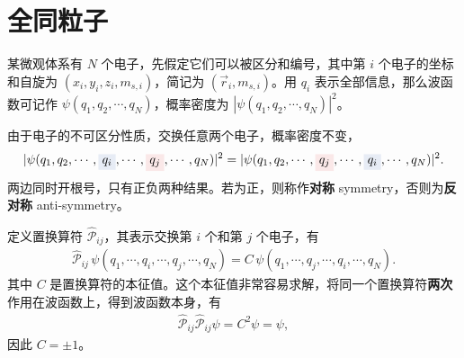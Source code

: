 \section{全同粒子}
某微观体系有 $N$ 个电子，先假定它们可以被区分和编号，其中第 $i$ 个电子的坐标和自旋为 $(x_i, y_i, z_i, m_{s,i})$，简记为 $(\vec r_i, m_{s,i})$。用 $q_i$ 表示全部信息，那么波函数可记作 $\psi(q_1, q_2, \cdots, q_N)$，概率密度为 $|\psi(q_1, q_2, \cdots, q_N)|^2$。

由于电子的不可区分性质，交换任意两个电子，概率密度不变，
\begin{align}
    |\psi(q_1, q_2, \cdots, 
    \colorbox{fudanBlue!10!white}{$q_i$}
    , \cdots, 
    \colorbox{fudanRed!10!white}{$q_j$}
    , \cdots, q_N)|^2 
    = 
    |\psi(q_1, q_2, \cdots, 
    \colorbox{fudanRed!10!white}{$q_j$}, \cdots, 
    \colorbox{fudanBlue!10!white}{$q_i$}
    , \cdots, q_N)|^2.
\end{align}
两边同时开根号，只有正负两种结果。若为正，则称作\textbf{对称} symmetry，否则为\textbf{反对称} anti-symmetry。

定义置换算符 $\hat{\mathcal{P}}_{ij}$，其表示交换第 $i$ 个和第 $j$ 个电子，有
\begin{align}
    \hat{\mathcal{P}}_{ij} \, \psi(q_1, \cdots, q_i, \cdots, q_j, \cdots, q_N) = C \, \psi(q_1, \cdots, q_j, \cdots, q_i, \cdots, q_N). 
\end{align}
其中 $C$ 是置换算符的本征值。这个本征值非常容易求解，将同一个置换算符\textbf{两次}作用在波函数上，得到波函数本身，有
\begin{align}
    \hat{\mathcal{P}}_{ij}\hat{\mathcal{P}}_{ij} \psi = C^2 \psi = \psi,
\end{align}
因此 $C = \pm1$。

